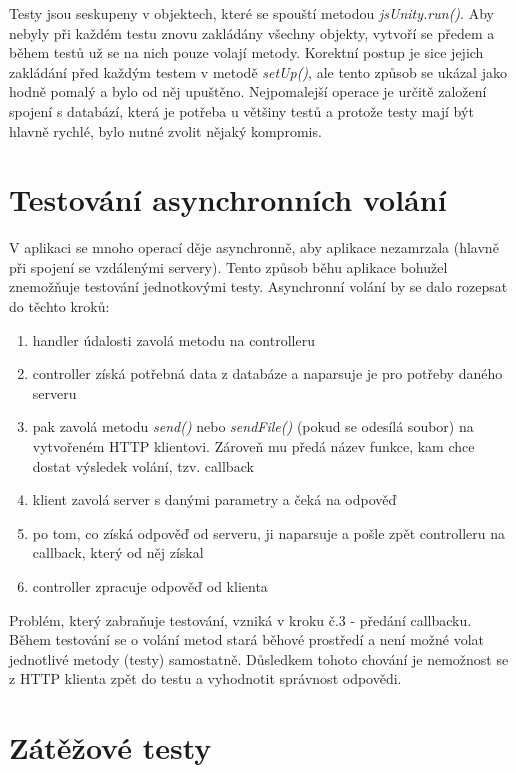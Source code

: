 Testy jsou seskupeny v objektech, které se spouští metodou \emph{jsUnity.run()}. Aby nebyly při každém testu znovu zakládány všechny objekty, vytvoří se předem a během testů už se na nich pouze volají metody. Korektní postup je sice jejich zakládání před každým testem v metodě \emph{setUp()}, ale tento způsob se ukázal jako hodně pomalý a bylo od něj upuštěno. Nejpomalejší operace je určitě založení spojení s databází, která je potřeba u většiny testů a protože testy mají být hlavně rychlé, bylo nutné zvolit nějaký kompromis.

\section{Testování asynchronních volání}

V aplikaci se mnoho operací děje asynchronně, aby aplikace nezamrzala (hlavně při spojení se vzdálenými servery). Tento způsob běhu aplikace bohužel znemožňuje testování jednotkovými testy. Asynchronní volání by se dalo rozepsat do těchto kroků:

\begin{enumerate}
\item handler údalosti zavolá metodu na controlleru
\item controller získá potřebná data z databáze a naparsuje je pro potřeby daného serveru
\item pak zavolá metodu \emph{send()} nebo \emph{sendFile()} (pokud se odesílá soubor) na vytvořeném HTTP klientovi. Zároveň mu předá název funkce, kam chce dostat výsledek volání, tzv. callback
\item klient zavolá server s danými parametry a čeká na odpověď
\item po tom, co získá odpověď od serveru, ji naparsuje a pošle zpět controlleru na callback, který od něj získal
\item controller zpracuje odpověď od klienta
\end{enumerate}

Problém, který zabraňuje testování, vzniká v kroku č.3 - předání callbacku. Během testování se o volání metod stará běhové prostředí a není možné volat jednotlivé metody (testy) samostatně. Důsledkem tohoto chování je nemožnost  se z HTTP klienta zpět do testu a vyhodnotit správnost odpovědi.

\section{Zátěžové testy}

